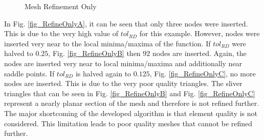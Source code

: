 \begin{figure}[h!]
  \begin{center}


  \caption{Mesh Refinement Only}
  \label{fig_RefineOnly}
  \end{center}
\end{figure}

In Fig. \ref{fig_RefineOnlyA}, it can be seen that only three nodes were
inserted. This is due to the very high value of $tol_{RD}$ for this
example. However, nodes were inserted very near to the local
minima/maxima of the function. If $tol_{RD}$ were halved to $0.25$, Fig.
\ref{fig_RefineOnlyB} then $92$ nodes are inserted. Again, the nodes are
inserted very near to local minima/maxima and additionally near saddle
points. If $tol_{RD}$ is halved again to $0.125$, Fig.
\ref{fig_RefineOnlyC}, no more nodes are inserted. This is due to the
very poor quality triangles. The sliver triangles that can be seen in
Fig. \ref{fig_RefineOnlyB} and Fig. \ref{fig_RefineOnlyC} represent a
nearly planar section of the mesh and therefore is not refined further.
The major shortcoming of the developed algorithm is that element quality
is not considered. This limitation leads to poor quality meshes that
cannot be refined further.

